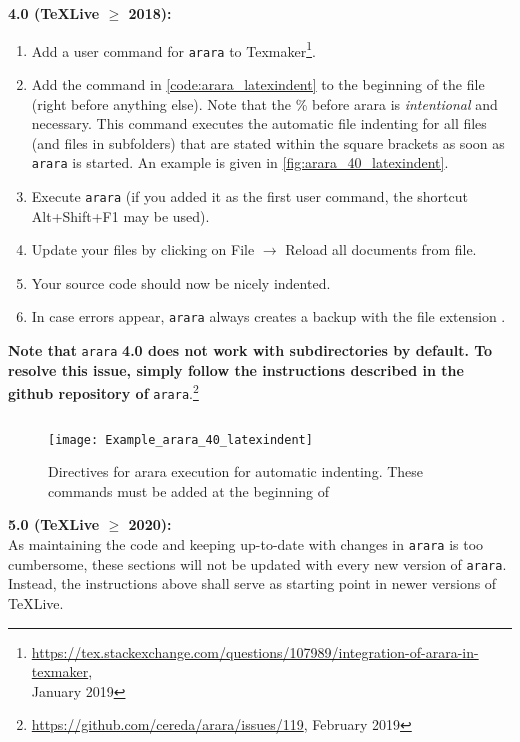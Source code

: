 	\textbf{4.0 (\TeX Live $\geq$ 2018):}
	      \begin{enumerate}[label={\arabic*{}.}]
		      \item Add a user command for \verb+arara+ to Texmaker\footnote{\url{https://tex.stackexchange.com/questions/107989/integration-of-arara-in-texmaker}, \\ January 2019}.
		      \item Add the command in \autoref{code:arara_latexindent} to the beginning of the  file (right before anything else). Note that the \% before arara is \emph{intentional} and necessary. This command executes the automatic file indenting for all files (and files in subfolders) that are stated within the square brackets as soon as \verb+arara+ is started. An example is given in \autoref{fig:arara_40_latexindent}.
		      \item Execute \verb+arara+ (if you added it as the first user command, the shortcut Alt+Shift+F1 may be used).
		      \item Update your files by clicking on File $\rightarrow$ Reload all documents from file.
		      \item Your source code should now be nicely indented.
		      \item In case errors appear, \verb+arara+ always creates a backup with the file extension .
	      \end{enumerate}
\textbf{Note that} \verb+arara+ \textbf{4.0 does not work with subdirectories by default. To resolve this issue, simply follow the instructions described in the github repository of} \verb+arara+.\footnote{\url{https://github.com/cereda/arara/issues/119}, February 2019}
	      \begin{lstlisting}[breaklines, caption={Setting up \texttt{arara} for \texttt{latexindent} in Texmaker}, float=tbh, label={code:arara_latexindent}, language=latex]
%*\%*) arara: indentsubdir: { overwrite : yes, files : [ folder/file1.tex, folder/file2.tex ] , settings: local, where: 00_Arara_and_Latexindent/localSettings.yaml }
		\end{lstlisting}
\begin{figure}[tbh]
	\centering
	\texttt{[image: Example\_arara\_40\_latexindent]}
	\caption[Directives for arara execution for automatic indenting]{Directives for arara execution for automatic indenting. These commands must be added at the beginning of }\label{fig:arara_40_latexindent}
\end{figure}

\textbf{5.0 (\TeX Live $\geq$ 2020):}\\
As maintaining the code and keeping up-to-date with changes in \verb+arara+ is too cumbersome, these sections will not be updated with every new version of \verb+arara+. Instead, the instructions above shall serve as starting point in newer versions of \TeX Live.